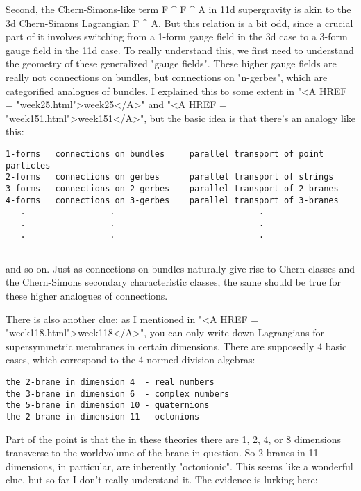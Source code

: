 Second, the Chern-Simons-like term F ^ F ^ A in 11d supergravity is akin
to the 3d Chern-Simons Lagrangian F ^ A.  But this relation is a bit
odd, since a crucial part of it involves switching from a 1-form gauge
field in the 3d case to a 3-form gauge field in the 11d case.  To really
understand this, we first need to understand the geometry of these
generalized "gauge fields".  These higher gauge fields are
really not connections on bundles, but connections on
"n-gerbes", which are categorified analogues of bundles.  I
explained this to some extent in "<A HREF =
"week25.html">week25</A>" and "<A HREF =
"week151.html">week151</A>", but the basic idea is that there's an
analogy like this:
 
\begin{verbatim}
1-forms   connections on bundles     parallel transport of point particles 
2-forms   connections on gerbes      parallel transport of strings 
3-forms   connections on 2-gerbes    parallel transport of 2-branes 
4-forms   connections on 3-gerbes    parallel transport of 3-branes 
   .                 .                             . 
   .                 .                             . 
   .                 .                             . 
 
\end{verbatim}
    
and so on.  Just as connections on bundles naturally give rise to 
Chern classes and the Chern-Simons secondary characteristic classes, 
the same should be true for these higher analogues of connections. 
 
There is also another clue: as I mentioned in "<A HREF =
"week118.html">week118</A>", you can only write down Lagrangians
for supersymmetric membranes in certain dimensions.  There are
supposedly 4 basic cases, which correspond to the 4 normed division
algebras:

\begin{verbatim}
the 2-brane in dimension 4  - real numbers
the 3-brane in dimension 6  - complex numbers
the 5-brane in dimension 10 - quaternions
the 2-brane in dimension 11 - octonions
\end{verbatim}
    
Part of the point is that the in these theories there are 1, 2, 4, 
or 8 dimensions transverse to the worldvolume of the brane in question.
So 2-branes in 11 dimensions, in particular, are inherently "octonionic". 
This seems like a wonderful clue, but so far I don't really understand it.   
The evidence is lurking here: 
 
